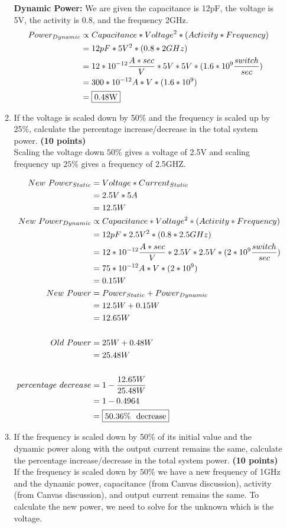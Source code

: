 \documentclass[a4paper, 15pt]{exam}
\begin{document}
\begin{enumerate}
\begin{enumerate}
   	\textbf{Dynamic Power:} We are given the capacitance is 12pF, the voltage is 5V, the activity is 0.8, and the frequency 2GHz.
   	\begin{align*} 
   			Power_{Dynamic} &\propto Capacitance * Voltage^2 * (Activity * Frequency) \\
   			&= 12pF * 5V^2 * (0.8 * 2GHz) \\
   			&= 12 * 10^{-12} \frac{A * sec}{V} * 5V * 5V * (1.6 * 10^9 \frac{switch}{sec})\\
   			&= 300 * 10^{-12} A * V * (1.6 * 10^9)\\
   			&= \fbox{0.48W}
   	\end{align*}
        \item If the voltage is scaled down by 50\% and the frequency is scaled up by 25\%, calculate the percentage increase/decrease in the total system power.   \textbf{(10 points)} \\
     Scaling the voltage down $50\%$ gives a voltage of 2.5V and scaling frequency up $25\%$ gives a frequency of 2.5GHZ.
     
     \begin{align*}
   			New \ Power_{Static} &= Voltage * Current_{Static} \\
   			&= 2.5V * 5A \\
   			&= 12.5W \\
   			New \ Power_{Dynamic} &\propto Capacitance * Voltage^2 * (Activity * Frequency) \\
   			&= 12pF * 2.5V^2 * (0.8 * 2.5GHz) \\
   			&= 12 * 10^{-12} \frac{A * sec}{V} * 2.5V * 2.5V * (2 * 10^9 \frac{switch}{sec})\\
   			&= 75 * 10^{-12} A * V * (2 * 10^9)\\
   			&= 0.15W \\
   			New \ Power &= Power_{Static} + Power_{Dynamic} \\
   			&= 12.5W + 0.15W \\
   			&= 12.65W\\ \\
   			Old \ Power &= 25W + 0.48W \\
   			&= 25.48W \\ \\
   			percentage \ decrease &= 1 - \frac{12.65W}{25.48W} \\
   			&= 1 - 0.4964 \\
   			&= \fbox{50.36\% \ decrease}
   	\end{align*}
        \item If the frequency is scaled down by 50\% of its initial value and the dynamic power along with the output current remains the same, calculate the percentage increase/decrease in the total system power.  \textbf{(10 points)} \\
      If the frequency is scaled down by $50\%$ we have a new frequency of 1GHz and the dynamic power, capacitance (from Canvas discussion), activity (from Canvas discussion), and output current remains the same. To calculate the new power, we need to solve for the unknown which is the voltage.
      

\end{enumerate}
\end{enumerate}
\end{document}
